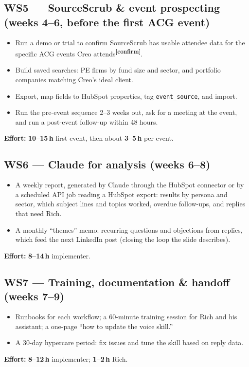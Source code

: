 \documentclass[11pt]{article}
\newcommand{\hrs}[1]{\textbf{#1\,h}}
\newcommand{\verify}{\textcolor{orange!80!black}{\textsuperscript{\textbf{[confirm]}}}}
\begin{document}
\subsection{WS5 --- SourceScrub \& event prospecting (weeks 4--6, before the first ACG event)}
\begin{itemize}
  \item Run a demo or trial to confirm SourceScrub has usable attendee data for the specific ACG
  events Creo attends\verify.
  \item Build saved searches: PE firms by fund size and sector, and portfolio companies matching
  Creo's ideal client.
  \item Export, map fields to HubSpot properties, tag \texttt{event\_source}, and import.
  \item Run the pre-event sequence 2--3 weeks out, ask for a meeting at the event, and run a
  post-event follow-up within 48 hours.
\end{itemize}
\textbf{Effort:} \hrs{10--15} first event, then about \hrs{3--5} per event.

\subsection{WS6 --- Claude for analysis (weeks 6--8)}
\begin{itemize}
  \item A weekly report, generated by Claude through the HubSpot connector or by a scheduled API
  job reading a HubSpot export: results by persona and sector, which subject lines and topics
  worked, overdue follow-ups, and replies that need Rich.
  \item A monthly ``themes'' memo: recurring questions and objections from replies, which feed
  the next LinkedIn post (closing the loop the slide describes).
\end{itemize}
\textbf{Effort:} \hrs{8--14} implementer.

\subsection{WS7 --- Training, documentation \& handoff (weeks 7--9)}
\begin{itemize}
  \item Runbooks for each workflow; a 60-minute training session for Rich and his assistant; a
  one-page ``how to update the voice skill.''
  \item A 30-day hypercare period: fix issues and tune the skill based on reply data.
\end{itemize}
\textbf{Effort:} \hrs{8--12} implementer; \hrs{1--2} Rich.
\end{document}
